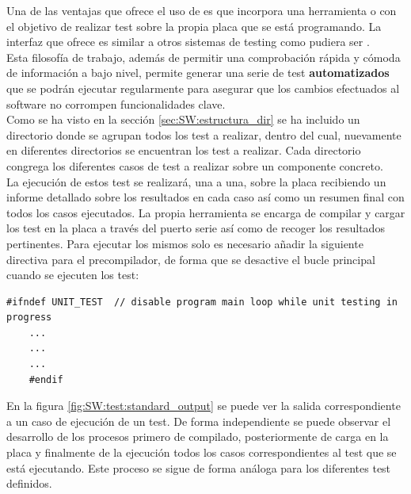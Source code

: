     Una de las ventajas que ofrece el uso de  es que incorpora una herramienta o   con el objetivo de realizar test sobre la propia placa que se está programando. La interfaz que ofrece es similar a otros sistemas de testing como pudiera ser .
    \\
    
    Esta filosofía de trabajo, además de permitir una comprobación rápida y cómoda de información a bajo nivel, permite generar una serie de test \textbf{automatizados} que se podrán ejecutar regularmente para asegurar que los cambios efectuados al software no corrompen funcionalidades clave.
    \\
    
    Como se ha visto en la sección \ref{sec:SW:estructura_dir} se ha incluido un directorio donde se agrupan todos los test a realizar, dentro del cual, nuevamente en diferentes directorios se encuentran los test a realizar. Cada directorio congrega los diferentes casos de test a realizar sobre un componente concreto.
    \\
    
    La ejecución de estos test se realizará, una a una, sobre la placa recibiendo un informe detallado sobre los resultados en cada caso así como un resumen final con todos los casos ejecutados. La propia herramienta se encarga de compilar y cargar los test en la placa a través del puerto serie así como de recoger los resultados pertinentes. Para ejecutar los mismos solo es necesario añadir la siguiente directiva para el precompilador, de forma que se desactive el bucle principal cuando se ejecuten los test:

    \begin{lstlisting}[frame=single]
    #ifndef UNIT_TEST  // disable program main loop while unit testing in progress
    ...
    ...
    ...
    #endif
    \end{lstlisting}

    En la figura \ref{fig:SW:test:standard_output} se puede ver la salida correspondiente a un caso de ejecución de un test. De forma independiente se puede observar el desarrollo de los procesos primero de compilado, posteriormente de carga en la placa y finalmente de la ejecución todos los casos correspondientes al test que se está ejecutando. Este proceso se sigue de forma análoga para los diferentes test definidos.


